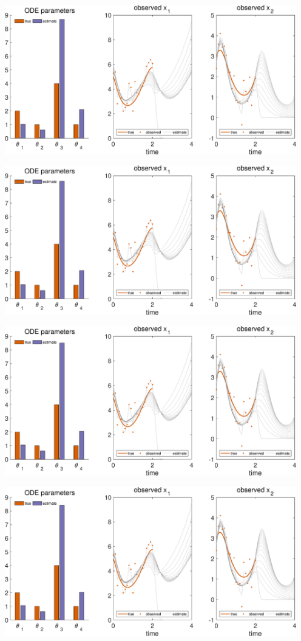 {\includegraphics [width=5in]{VGM_for_Lotka_Volterra_14.eps}

\includegraphics [width=5in]{VGM_for_Lotka_Volterra_15.eps}

\includegraphics [width=5in]{VGM_for_Lotka_Volterra_16.eps}

\includegraphics [width=5in]{VGM_for_Lotka_Volterra_17.eps}

}
